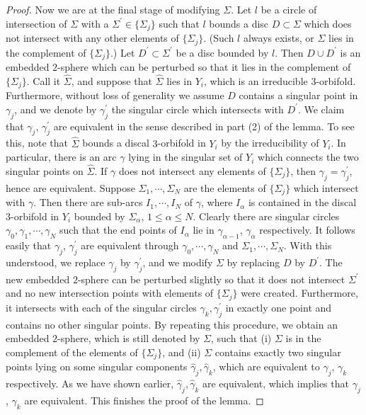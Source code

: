 \documentclass[11pt]{amsart}
\theoremstyle{plain}
\numberwithin{theorem}{section}
\theoremstyle{definition}
\begin{document}
\begin{proof}
Now we are at the final stage of modifying $\Sigma$. Let $l$ be a circle of intersection of
$\Sigma$ with a $\Sigma^\prime\in \{\Sigma_j\}$ such that $l$ bounds a disc $D\subset \Sigma$ 
which does not intersect with any other elements of $\{\Sigma_j\}$. (Such $l$ always exists, or
$\Sigma$ lies in the complement of $\{\Sigma_j\}$.) Let $D^\prime\subset \Sigma^\prime$ be
a disc bounded by $l$. Then $D\cup D^\prime$ is an embedded $2$-sphere which can be
perturbed so that it lies in the complement of $\{\Sigma_j\}$. Call it $\hat{\Sigma}$, and suppose 
that $\hat{\Sigma}$ lies in $Y_i$, which is an irreducible $3$-orbifold. Furthermore, without loss of 
generality we assume $D$ contains a singular point in $\gamma_j$, and we denote by 
$\gamma_j^\prime$ the singular circle which intersects with $D^\prime$. We claim
that $\gamma_j$, $\gamma_j^\prime$ are equivalent in the sense described in part (2) of
the lemma. To see this, note that $\hat{\Sigma}$ bounds a discal $3$-orbifold in $Y_i$ by
the irreducibility of $Y_i$. In particular, there is an arc $\gamma$ lying in the singular set
of $Y_i$ which connects the two singular points on $\hat{\Sigma}$. If $\gamma$ does not 
intersect any elements of $\{\Sigma_j\}$, then $\gamma_j=\gamma_j^\prime$, hence
are equivalent. Suppose $\Sigma_1, \cdots, \Sigma_N$ are the elements of $\{\Sigma_j\}$ 
which intersect with $\gamma$. Then there are sub-arcs $I_1,\cdots,I_N$ of $\gamma$, where
$I_\alpha$ is contained in the discal $3$-orbifold in $Y_i$ bounded by $\Sigma_\alpha$,
$1\leq \alpha\leq N$. Clearly there are singular circles 
$\gamma_0,\gamma_1,\cdots,\gamma_N$ such that the end points of $I_\alpha$ lie in 
$\gamma_{\alpha-1}$, $\gamma_\alpha$ respectively.  It follows easily that $\gamma_j$, 
$\gamma_j^\prime$ are equivalent through $\gamma_0,\cdots,\gamma_N$ and $\Sigma_1,
\cdots,\Sigma_N$. With this understood, we replace $\gamma_j$ by $\gamma_j^\prime$,
and we modify $\Sigma$ by replacing $D$ by $D^\prime$. The new embedded $2$-sphere
can be perturbed slightly so that it does not intersect $\Sigma^\prime$ and no new intersection
points with elements of $\{\Sigma_j\}$ were created. Furthermore, it intersects with each of the singular circles $\gamma_k,\gamma_j^\prime$ in exactly one point and contains no
other singular points. By repeating this procedure, we obtain an embedded $2$-sphere,
which is still denoted by $\Sigma$, such that (i) $\Sigma$ is in the complement of the elements
of $\{\Sigma_j\}$, and (ii) $\Sigma$ contains exactly two singular points lying on some singular
components $\hat{\gamma}_j,\hat{\gamma}_k$, which are equivalent to $\gamma_j$,
$\gamma_k$ respectively. As we have shown earlier, $\hat{\gamma}_j,\hat{\gamma}_k$ are
equivalent, which implies that $\gamma_j$, $\gamma_k$ are equivalent. 
This finishes the proof of the lemma.

\end{proof}
\end{document}
